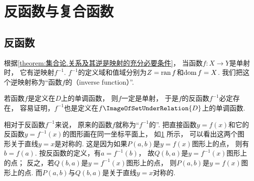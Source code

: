 \section{反函数与复合函数}
\subsection{反函数}
根据\cref{theorem:集合论.关系及其逆是映射的充分必要条件}，
当函数\(f\colon X \to Y\)是单射时，
它有逆映射\(f^{-1}\).
\(f^{-1}\)的定义域和值域分别为\(Z=\operatorname{ran} f\)和\(\operatorname{dom} f=X\).
我们把这个逆映射称为“函数\(f\)的（inverse function）”.

若函数\(f\)是定义在\(D\)上的单调函数，
则\(f\)一定是单射，
于是\(f\)的反函数\(f^{-1}\)必定存在，
容易证明，\(f^{-1}\)也是定义在\(f\ImageOfSetUnderRelation{D}\)上的单调函数.

相对于反函数\(f^{-1}\)来说，
原来的函数\(f\)就称为“\(f^{-1}\)的”.
把直接函数\(y=f(x)\)和它的反函数\(y=f^{-1}(x)\)的图形画在同一坐标平面上，
如\cref{figure:函数.直接函数与反函数的图形的对称性} 所示，
可以看出这两个图形关于直线\(y=x\)是对称的.
这是因为如果\(P(a,b)\)是\(y=f(x)\)图形上的点，
则有\(b=f(a)\).
按反函数的定义，有\(a=f^{-1}(b)\)，
故\(Q(b,a)\)是\(y=f^{-1}(x)\)图形上的点；
反之，若\(Q(b,a)\)是\(y=f^{-1}(x)\)图形上的点，
则\(P(a,b)\)是\(y=f(x)\)图形上的点.
而\(P(a,b)\)与\(Q(b,a)\)是关于直线\(y=x\)对称的.

\begin{figure}[ht]
	\centering
	\caption{}\label{figure:函数.直接函数与反函数的图形的对称性}
\end{figure}

